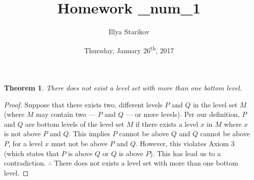 \documentclass[12pt]{article}
\title{Homework \_num_1}
\date{Thursday, January 26\textsuperscript{th}, 2017}
\author{Illya Starikov}
\newtheorem{theorem}{Theorem}
\begin{document}
\maketitle



\begin{theorem}
    There does not exist a level set with more than one bottom level.
\end{theorem}

\begin{proof}
    Suppose that there exists two, different levels $P$ and $Q$ in the level set $M$ (where $M$ may contain two --- $P$ and $Q$ --- or more levels). Per our definition, $P$ and $Q$ are bottom levels of the level set $M$ if there exists a level $x$ in $M$ where $x$ is not above $P$ and $Q$. This implies $P$ cannot be above $Q$ and $Q$ cannot be above $P$, for a level $x$ must not be above $P$ and $Q$. However, this violates Axiom 3 (which states that $P$ is above $Q$ or $Q$ is above $P$). This has lead us to a contradiction. $\therefore$ There does not exists a level set with more than one bottom level.
\end{proof}
\end{document}
